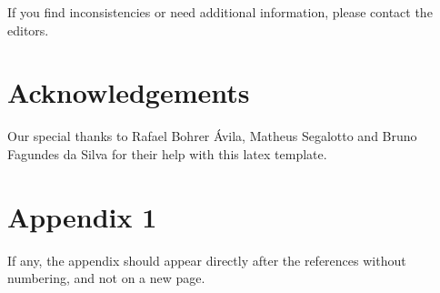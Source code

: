 \documentclass[english, spanish,brazilian]{RBIEarticle} %
\begin{document}
\begin{itemize}
If you find inconsistencies or need additional information, please contact the editors.


\section*{Acknowledgements}
Our special thanks to Rafael Bohrer Ávila, Matheus Segalotto and Bruno Fagundes da Silva for their help with this latex template. 



\printbibliography


 \section*{Appendix 1}
\label{apendice1}

If any, the appendix should appear directly after the references without numbering, and not on a new page.


\end{itemize}
\end{document}
